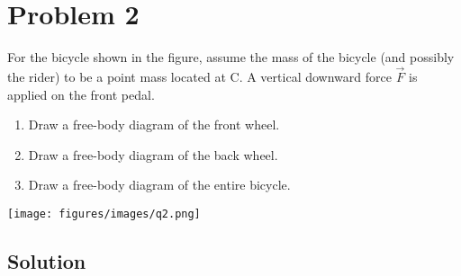 \section*{Problem 2}

For the bicycle shown in the figure, assume the mass of the bicycle (and possibly the rider) to be a point mass located at C.
A vertical downward force \( \vec{F} \) is applied on the front pedal.

\begin{enumerate}[label = (\alph*)]
    \item Draw a free-body diagram of the front wheel.
    \item Draw a free-body diagram of the back wheel.
    \item Draw a free-body diagram of the entire bicycle.
\end{enumerate}

\begin{figure*}[h]
    \centering
    \texttt{[image: figures/images/q2.png]}
\end{figure*}

\subsection*{Solution}
